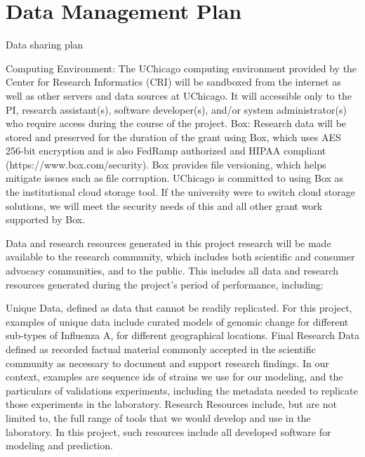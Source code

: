 \documentclass[onecolumn, compsoc,12pt]{IEEEtran}
\begin{document}
\clearpage


\section*{Data Management Plan}



        Data sharing plan

              Computing Environment: The UChicago computing environment provided by the Center for Research Informatics (CRI) will be sandboxed from the internet as well as other servers and data sources at UChicago. It will accessible only to the PI, research assistant(s), software developer(s), and/or system administrator(s) who require access during the course of the project.
Box: Research data will be stored and preserved for the duration of the grant using Box, which uses AES 256-bit encryption and is also FedRamp authorized and HIPAA compliant (https://www.box.com/security). Box provides file versioning, which helps mitigate issues such as file corruption. UChicago is committed to using Box as the institutional cloud storage tool. If the university were to switch cloud storage solutions, we will meet the security needs of this and all other grant work supported by Box.


              Data and research resources generated in this project research will be made available to the research community, which includes both scientific and consumer advocacy communities, and to the public. This includes all data and research resources generated during the project’s period of performance, including:

Unique Data, defined as data that cannot be readily replicated. For this project, examples of unique data include curated models of genomic change for different sub-types of Influenza A, for different geographical locations.
Final Research Data defined as recorded factual material commonly accepted in the scientific community as necessary to document and support research findings. In our context, examples are sequence ids of strains we use for our modeling, and the particulars of validations experiments, including the metadata needed to replicate those experiments in the laboratory.
Research Resources include, but are not limited to, the full range of tools that we would develop and use in the laboratory. In this project, such resources include all developed software for modeling and prediction.
\end{document}
